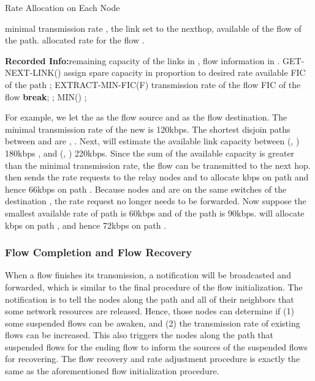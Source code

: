\documentclass[conference]{IEEEtran}
\begin{document}
\begin{tiny}
\renewcommand{\algorithmicrequire}{\textbf{Input:}}
\renewcommand{\algorithmicensure}{\textbf{Output:}}
\newcommand{\RECORD}{\textbf{Recorded Info:}}
\newcommand{\factorial}{\ensuremath{\mbox{\sc Factorial}}}
\begin{algorithm}[h!]
\caption{Rate Allocation on Each Node} \label{alg:rate-allocation}
\begin{algorithmic}[1]
\REQUIRE minimal transmission rate , the link set  to the nexthop, available  of the flow of the path.
\ENSURE allocated rate for the flow .

\RECORD remaining capacity of the links in , flow information in .
\medskip
\WHILE {}
\STATE  GET-NEXT-LINK()
\STATE   assign spare capacity in proportion to 
\ELSE
\STATE 
\ENDIF
\STATE 
\ELSE
{}
\STATE  desired rate 
\STATE  available FIC of the path ;
\WHILE { }
\STATE  EXTRACT-MIN-FIC(F)
\STATE  transmission rate of the flow 
\STATE  FIC of the flow 
\IF { }
\STATE 
\STATE \textbf{break};
\ENDIF
\STATE ;
\STATE 
\ENDWHILE
\ENDIF
\ENDWHILE
\STATE  MIN()
\RETURN ;
\end{algorithmic}
\end{algorithm}
\end{tiny}

For example, we let the  as the flow source and  as the flow destination. The minimal transmission rate of the new  is 120kbps. The shortest disjoin paths between  and  are , . Next,  will estimate the available link capacity between (, )  180kbps , and (, )  220kbps. Since the sum of the available capacity is greater than the minimal transmission rate, the flow can be transmitted to the next hop.  then sends the rate requests to the relay nodes  and  to allocate kbps on path  and hence 66kbps on path . Because nodes  and  are on the same switches of the destination , the rate request no longer needs to be forwarded. Now suppose the smallest available rate of path  is 60kbps and of the path  is 90kbps.  will allocate kbps on path , and hence 72kbps on path .

\subsubsection{Flow Completion and Flow Recovery}

When a flow finishes its transmission, a notification will be broadcasted and forwarded, which is similar to the final procedure of the flow initialization. The notification is to tell the nodes along the path and all of their neighbors that some network resources are released. Hence, those nodes can determine if (1) some suspended flows can be awaken, and (2) the transmission rate of existing flows can be increased. This also triggers the nodes along the path that suspended flows for the ending flow to inform the sources of the suspended flows for recovering. The flow recovery and rate adjustment procedure is exactly the same as the aforementioned flow initialization procedure.
\end{document}
